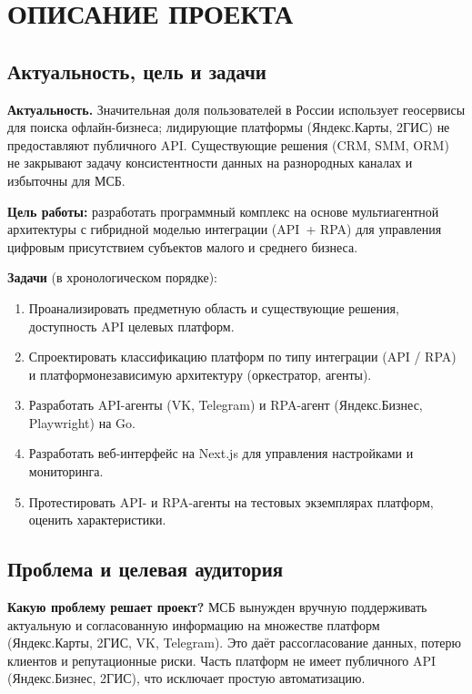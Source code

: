 
\chapter{{\fontsize{14pt}{21pt}\selectfont\MakeUppercase{Описание проекта}}}
\label{ch:body}

\section{Актуальность, цель и задачи}

\textbf{Актуальность.} Значительная доля пользователей в России использует геосервисы для поиска офлайн-бизнеса; лидирующие платформы (Яндекс.Карты, 2ГИС) не предоставляют публичного API. Существующие решения (CRM, SMM, ORM) не закрывают задачу консистентности данных на разнородных каналах и избыточны для МСБ.

\textbf{Цель работы:} разработать программный комплекс на основе мультиагентной архитектуры с гибридной моделью интеграции (API~+ RPA) для управления цифровым присутствием субъектов малого и среднего бизнеса.

\textbf{Задачи} (в хронологическом порядке):
\begin{enumerate}
  \item Проанализировать предметную область и существующие решения, доступность API целевых платформ.
  \item Спроектировать классификацию платформ по типу интеграции (API / RPA) и платформонезависимую архитектуру (оркестратор, агенты).
  \item Разработать API-агенты (VK, Telegram) и RPA-агент (Яндекс.Бизнес, Playwright) на Go.
  \item Разработать веб-интерфейс на Next.js для управления настройками и мониторинга.
  \item Протестировать API- и RPA-агенты на тестовых экземплярах платформ, оценить характеристики.
\end{enumerate}

\section{Проблема и целевая аудитория}

\textbf{Какую проблему решает проект?} МСБ вынужден вручную поддерживать актуальную и согласованную информацию на множестве платформ (Яндекс.Карты, 2ГИС, VK, Telegram). Это даёт рассогласование данных, потерю клиентов и репутационные риски. Часть платформ не имеет публичного API (Яндекс.Бизнес, 2ГИС), что исключает простую автоматизацию.

